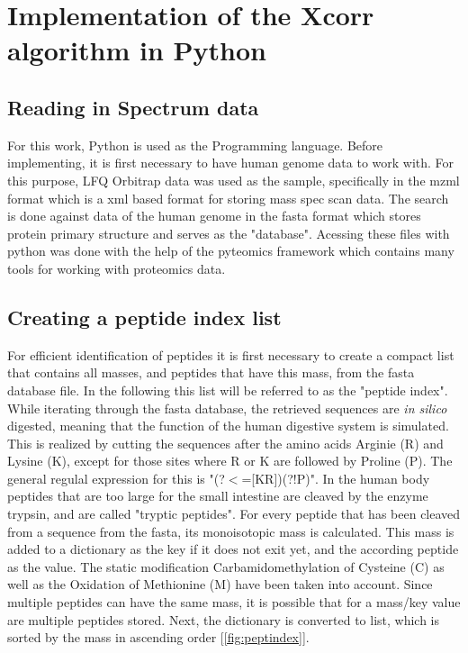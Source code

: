 \documentclass[11pt]{article}
\begin{document}
\section{Implementation of the Xcorr algorithm in Python}
\subsection{Reading in Spectrum data}

For this work, Python is used as the Programming language. Before implementing, it is first necessary to have human genome data to work with. For this purpose, LFQ Orbitrap data was used as the sample, specifically in the mzml format which is a xml based format for storing mass spec scan data. The search is done against data of the human genome in the fasta format which stores protein primary structure and serves as the "database".
Acessing these files with python was done with the help of the pyteomics framework \cite{pyteomics, pyteomics-five-years} which contains many tools for working with proteomics data. 

\subsection{Creating a peptide index list}
For efficient identification of peptides it is first necessary to create a compact list that contains all masses, and peptides that have this mass, from the fasta database file. In the following this list will be referred to as the "peptide index". While iterating through the fasta database, the retrieved sequences are \textit{in silico} digested, meaning that the function of the human digestive system is simulated. This is realized by cutting the sequences after the amino acids Arginie (R) and Lysine (K), except for those sites where R or K are followed by Proline (P). The general regulal expression for this is "(?$<$=[KR])(?!P)". In the human body peptides that are too large for the small intestine are cleaved by the enzyme trypsin, and are called "tryptic peptides". For every peptide that has been cleaved from a sequence from the fasta, its monoisotopic mass is calculated. This mass is added to a dictionary as the key if it does not exit yet, and the according peptide as the value. The static modification Carbamidomethylation of Cysteine (C) as well as the Oxidation of Methionine (M) have been taken into account. Since multiple peptides can have the same mass, it is possible that for a mass/key value are multiple peptides stored. Next, the dictionary is converted to list, which is sorted by the mass in ascending order [\cref{fig:peptindex}]. 
\end{document}
